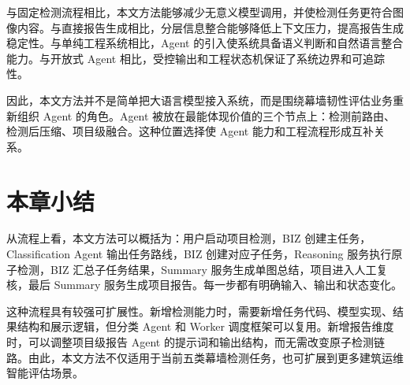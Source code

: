 与固定检测流程相比，本文方法能够减少无意义模型调用，并使检测任务更符合图像内容。与直接报告生成相比，分层信息整合能够降低上下文压力，提高报告生成稳定性。与单纯工程系统相比，Agent 的引入使系统具备语义判断和自然语言整合能力。与开放式 Agent 相比，受控输出和工程状态机保证了系统边界和可追踪性。

因此，本文方法并不是简单把大语言模型接入系统，而是围绕幕墙韧性评估业务重新组织 Agent 的角色。Agent 被放在最能体现价值的三个节点上：检测前路由、检测后压缩、项目级融合。这种位置选择使 Agent 能力和工程流程形成互补关系。

\section{本章小结}
\label{sec:method-flow-summary}

从流程上看，本文方法可以概括为：用户启动项目检测，BIZ 创建主任务，Classification Agent 输出任务路线，BIZ 创建对应子任务，Reasoning 服务执行原子检测，BIZ 汇总子任务结果，Summary 服务生成单图总结，项目进入人工复核，最后 Summary 服务生成项目报告。每一步都有明确输入、输出和状态变化。

这种流程具有较强可扩展性。新增检测能力时，需要新增任务代码、模型实现、结果结构和展示逻辑，但分类 Agent 和 Worker 调度框架可以复用。新增报告维度时，可以调整项目级报告 Agent 的提示词和输出结构，而无需改变原子检测链路。由此，本文方法不仅适用于当前五类幕墙检测任务，也可扩展到更多建筑运维智能评估场景。
